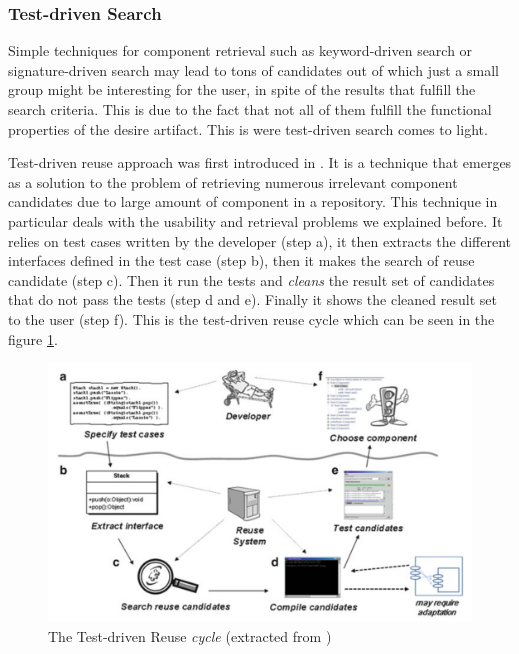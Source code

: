 \subsubsection{Test-driven Search}
Simple techniques for component retrieval such as keyword-driven search or signature-driven search may lead to tons of candidates out of which just a small group might be interesting for the user, in spite of the results that fulfill the search criteria. This is due to the fact that not all of them fulfill the functional properties of the desire artifact. This is were test-driven search comes to light. 

Test-driven reuse approach was first introduced in \cite{Hummel2004}. It is a technique that emerges as a solution to the problem of retrieving numerous irrelevant component candidates due to large amount of component in a repository. This technique in particular deals with the usability and retrieval problems we explained before. It relies on test cases written by the developer (step a), it then extracts the different interfaces defined in the test case (step b), then it makes the search of reuse candidate (step c). Then it run the tests and \textit{cleans} the result set of candidates that do not pass the tests (step d and e). Finally it shows the cleaned result set to the user (step f). This is the test-driven reuse cycle which can be seen in the figure \ref{fig:test-driven-cycle}.

\begin{figure}[ht]
	\centering
    \includegraphics[width=\textwidth]{grafiken/test-driven-cycle}
    \caption{The Test-driven Reuse \textit{cycle} (extracted from \cite{Hummel2013})}
    \label{fig:test-driven-cycle}
\end{figure}

